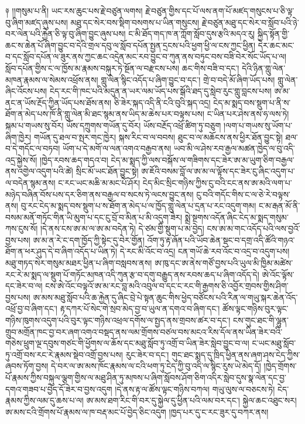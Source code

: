 \documentclass{article}
\begin{document}
༈ །།གསུམ་པ་ནི། ཡང་རས་ཆུང་པས་རྗེ་བཙུན་ལགས། རྗེ་བཙུན་གྱིས་དང་པོ་ལས་ནག་པོ་མཛད་གསུངས་པ་ཅི་ལྟ་བུ་ཞིག་མཛད་ཞུས་པས། མཐུ་དང་སེར་བས་སྡིག་བསགས་པ་ཡིན་གསུངས། རྗེ་བཙུན་མཐུ་དང་སེར་བ་སློབ་པའི་ཉེ་བར་ལེན་པའི་རྐྱེན་ཅི་ལྟ་བུ་ཞིག་བྱུང་ཞུས་པས། ང་མི་ཐོད་གད་ཁ་ན་ཀློག་སློབ་དུས་རྩའི་མདའ་རུ། སྐྱིད་སྟོན་གྱི་ཆང་ས་ཆེན་པོ་ཞིག་བྱུང་བ་དེའི་གྲལ་དབུ་ལ་སློབ་དཔོན་སྤྱན་དྲངས་པའི་ཕྱག་ཕྱི་ལ་ངས་ཀྱང་ཕྱིན། དེར་ཆང་མང་བ་དང་སློབ་དཔོན་ལ་ཟུར་ནས་ཀྱང་ཆང་འདྲེན་མང་རབ་བྱུང་བ་ཀུན་ནས་བཏུང་བས་བཟི་བེར་སོང་ཡོད་པ་ལ། སློབ་དཔོན་གྱིས་ང་ལ་ཁྱོས་མ་རྣམས་བསྐུར་ཏེ་སྔོན་ལ་བརྫངས་པས། ཆང་གིས་བཟི་བ་དང་། དེའི་ཉིན་གླུ་ལེན་མཁན་རྣམས་ལ་སེམས་འཕྲོས་ནས། གླུ་ལེན་སྙིང་འདོད་པ་ཞིག་བྱུང་བ་དང་། གྲེ་བ་བདེ་མོ་ཞིག་ཡོད་པས། གླུ་ལེན་ཞིང་འོངས་པས། ངེད་རང་གི་ཁང་པའི་མདུན་ན་ཡར་ལམ་ཡོད་པས་སྒོའི་ཐད་དུ་སླེབ་རུང་གླུ་བླངས་པས། ཨ་མ་ནང་ན་ཡོས་རྔོད་ཀྱིན་ཡོད་པས་ཐོས་ནས། ཅི་ཟེར་སྐད་འདི་ནི་ངའི་བུའི་སྐད་འདྲ། ངེད་མ་སྨད་བས་སྡུག་པ་ནི་ས་ཐོག་ན་མེད་པས་ཁོ་ནི་གླུ་ལེན་མི་ཐང་སྙམ་ནས་ཡིད་མ་ཆེས་པར་བལྟས་པས། ང་ཡིན་པར་ཤེས་ནས་ཧ་ལས་ཏེ། སྐམ་པ་གཡས་སུ་བོར། ཡོས་དཀྲུགས་གཡོན་དུ་བོར། ཡོས་བརྔོད་འཕྲོ་ཚིག་ཏུ་བཅུག །ལག་པ་གཡས་སུ་ཡོག་པ་ཞིག་ཁྱེར། གཡོན་དུ་ཐལ་བ་སྤར་གང་ཁྱེར། སྐས་རིང་བ་ལ་བབས། ཐུང་བ་ལ་མཆོངས་ནས་ཕྱིར་ཐོན་བྱུང་སྟེ། ཐལ་བ་དེ་གདོང་ལ་བཏབ། ཡོག་པ་དེ་མགོ་ལ་ལན་འགའ་བརྒྱབ་ནས། ཡབ་མི་ལ་ཤེས་རབ་རྒྱལ་མཚན་ཁྱེད་ལ་བུ་འདི་འདྲ་སྐྱེས་སོ། །ཁྱེད་རབས་ཆད་གདའ་བ། ངེད་མ་སྨད་ཀྱི་ལས་བསྐོས་ལ་གཟིགས་དང་ཟེར་ཨ་མ་ཡུག་ཅིག་བརྒྱལ་ནས་འགྱེལ་འདུག་པའི་ཚེ། སྲིང་མོ་ཡང་ཐོན་བྱུང་སྟེ། ཨ་ཇོའི་བསམ་བློ་ལ་ཨ་མ་ལ་ལྟོས་དང་ཟེར་ངུ་ཞིང་འདུག་པ་ལ་བདེན་སྙམ་ནས། ང་རང་ཡང་མཆི་མ་མང་པོ་ཤོར། ངེད་མིང་སྲིང་གཉིས་ཀྱིས་ངུ་བའི་ངང་ནས་ཨ་མའི་ལག་པ་མཉེད་བཞིན་བོས་པས་དར་ཅིག་ནས་བརྒྱལ་བ་སངས་ཏེ་ལངས་བྱུང་ནས། ངུ་བའི་གདོང་གིས་ང་ལ་ཅེ་རེ་བལྟས་ནས། བུ་རང་ངེད་མ་སྨད་བས་སྡུག་པ་ས་ཐོག་ན་མེད་པ་ལ་ཁྱོད་གླུ་ལེན་པ་དྲན་པ་རང་འདུག་གམ། ང་མ་རྒན་མོ་ནི་བསམ་མནོ་གཏོང་གིན་ཡི་མུག་པ་དང་ངུ་བྲོ་བ་མིན་པ་མི་འདུག་ཟེར། སྨྲེ་སྔགས་འདོན་ཞིང་ངེད་མ་སྨད་གསུམ་ཀས་ངུས་སོ། །དེ་ནས་ངས་ཨ་མ་ལ་ཨ་མ་བདེན་ཏེ། དེ་ཙམ་གྱི་སྡུག་པ་མ་བྱེད། ངས་ཨ་མ་གང་འདོད་པའི་ལས་བྱའོ་བྱས་པས། ཨ་མ་ན་རེ་ང་དག་ཁྱོད་ཀྱི་སྟེང་དུ་བེར་གྱོན། འོག་ཏུ་རྟ་ཞོན་པའི་ཡོབ་ཆེན་སྡང་བ་དགྲ་འདི་ཚོའི་གཉའ་ཐོག་ན་ཕར་ཤུད་དེ་བ་ཞིག་འདོད་པ་ཡིན་ཏེ། དེ་རང་མི་འོང་བ་འདྲ། ངན་གཡོ་ཆེ་རབ་འོང་བ་འདྲ་བ་འདུག་པས། མཐུ་གཏད་སེར་གསུམ་མཐར་ཕྱིན་པ་ཞིག་བསླབས་ནས། ཨ་ཁུ་དང་ཨ་ནེས་གཙོ་བྱས་པའི་ཡུལ་མི་ཁྱིམ་མཚེས་རང་རེ་མ་སྨད་ལ་སྡུག་པོ་གཏོང་མཁན་འདི་ཀུན་རྩ་བ་དགུ་བརྒྱུད་ནས་རབས་ཆད་པ་ཞིག་འདོད་དེ། ཨེ་འོང་ལྟོས་དང་ཟེར་བ་ལ། ངས་ཨེ་འོང་བལྟའོ་ཨ་མ་རང་བླ་མའི་འབུལ་བ་དང་ང་རང་གི་རྒྱགས་ཅི་འབྱོར་གྲབས་གྱིས་ཤིག་བྱས་པས། ཨ་མས་མཐུ་སློབ་པའི་ཆ་རྐྱེན་དུ་ཞིང་བྲེ་པེ་སྟན་ཆུང་གིས་ཕྱེད་བཙོངས་པའི་རིན་ལ་གཡུ་སྐར་ཆེན་འོད་འཕྲོ་བྱ་བ་ཞིག་དང་། རྟ་དཀར་པོ་སེང་གེ་སྲབ་མེད་བྱ་བ་ཡུལ་ན་དགའ་བ་ཞིག་དང་། ཚོས་ལྟང་གཉིས་བུར་ལྟང་གཉིས་ཁུགས་འདུག་པའི་བུར་ལྟང་གཉིས་འཕྲལ་དགོས་ལ་སྤྱད་ནས་གྲབས་ཚར་བ་དང་། ངས་གུང་ཐང་གི་ལྷུན་གྲུབ་མགྲོན་ཁང་བྱ་བར་ཞག་འགའ་བསྡད་ནས་ལམ་གྲོགས་བཙལ་བས་མངའ་རིས་དོལ་ནས་ཡིན་ཟེར་བའི་གཅེས་ཕྲུག་ལྔ་དབུས་གཙང་གི་ཕྱོགས་ལ་ཆོས་དང་མཐུ་སློབ་ཏུ་འགྲོ་བ་ཡིན་ཟེར་སླེབ་བྱུང་བ་ལ། ང་ཡང་མཐུ་སློབ་ཏུ་འགྲོ་བས་རང་རེ་རྣམས་སྡེབ་འགྲོ་བྱས་པས། རུང་ཟེར་བ་དང་། གུང་ཐང་སྨད་དུ་ཁྲིད་ཕྱིན་ནས་ཞག་ཤས་ངེད་ཀྱིས་ཞབས་ཏོག་བྱས། དེ་བར་ལ་ཨ་མས་ཁོང་རྣམས་ལ་ངའི་ཕག་ཏུ་ངེད་ཀྱི་བུ་འདི་ལ་སྙིང་རུས་ཡེ་མེད་དོ། །ཁྱེད་གྲོགས་པོ་རྣམས་ཀྱིས་བསྐུལ་ལྕག་གྱིས་ལ་མཐུ་ཤིན་ཏུ་མཁས་པ་ཞིག་སློབས་ཤོག་ཅིག་འདིར་སླེབ་དུས་སྣ་ལེན་དང་བྱ་དགའ་གཟབ་པ་བྱེད་དོ་ཟེར་བ་བྱས་འདུག །དེ་ནས་རྟ་ལ་ཚོས་ལྟང་གཉིས་བཀལ། གཡུ་ལུས་ལ་བཅངས་ཏེ། ངེད་རྣམས་ཀྱིས་ལམ་དུ་ཆས་པ་ལ། ཨ་མས་ཐག་རིང་གི་བར་དུ་སྐྱེལ་དུ་ཕྱིན་པའི་ལམ་བར་དང་། སྐྱེལ་ཆང་འཐུང་སར། ཨ་མས་ངའི་གྲོགས་པོ་རྣམས་ལ་ཁ་བརྡ་མང་པོ་བྱེད་ཅིང་འདུག །ཁྱད་པར་དུ་ང་རང་ཟུར་དུ་བཀར་ནས། 
\end{document}

